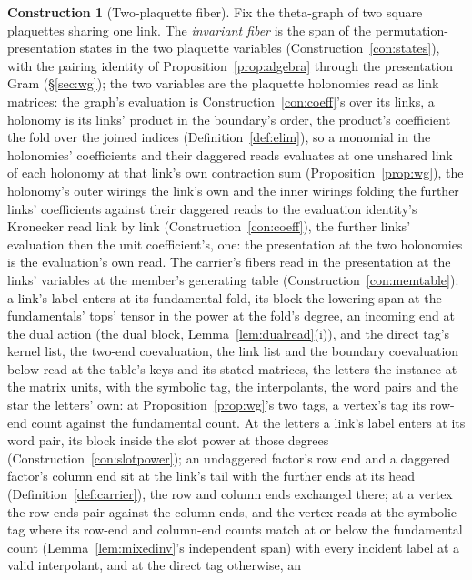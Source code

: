 \documentclass[11pt]{article}
\theoremstyle{definition}
\newtheorem{construction}{Construction}
\begin{document}
\begin{construction}[Two-plaquette fiber]\label{con:fiber}
Fix the theta-graph of two square plaquettes sharing one link. The
\emph{invariant fiber} is the span of the permutation-presentation states
in the two plaquette variables (Construction~\ref{con:states}), with the pairing identity of Proposition~\ref{prop:algebra} through the
presentation Gram (\S\ref{sec:wg}); the two variables are the
plaquette holonomies read as link matrices: the graph's evaluation
is Construction~\ref{con:coeff}'s over its links, a holonomy is
its links' product in the boundary's order, the product's
coefficient the fold over the joined indices
(Definition~\ref{def:elim}), so a monomial in the holonomies'
coefficients and their daggered reads evaluates at one unshared
link of each holonomy at that link's own contraction sum
(Proposition~\ref{prop:wg}), the holonomy's outer wirings the
link's own and the inner wirings folding the further links'
coefficients against their daggered reads to the evaluation
identity's Kronecker read link by link
(Construction~\ref{con:coeff}), the further links' evaluation then
the unit coefficient's, one: the presentation at the two holonomies
is the evaluation's own read.
The carrier's fibers read in the presentation at the links'
variables at the member's generating table
(Construction~\ref{con:memtable}): a link's label enters at its
fundamental fold, its block the lowering span at the fundamentals'
tops' tensor in the power at the fold's degree, an incoming end at
the dual action (the dual block, Lemma~\ref{lem:dualread}(i)), and
the direct tag's kernel list, the two-end coevaluation, the link
list and the boundary coevaluation below read at the table's keys
and its stated matrices, the letters the instance at the matrix
units, with the symbolic tag, the interpolants, the word pairs and
the star the letters' own: at Proposition~\ref{prop:wg}'s two tags, a vertex's tag
its row-end count against the fundamental count. At the letters a
link's label
enters at its word pair, its block inside the slot power at those
degrees (Construction~\ref{con:slotpower}); an undaggered factor's row end and a
daggered factor's column end sit at the link's tail with the
further ends at its head (Definition~\ref{def:carrier}), the row
and column ends exchanged there; at a vertex the row ends pair against the column ends, and
the vertex reads at the symbolic tag where its row-end and
column-end counts match at or below the fundamental count
(Lemma~\ref{lem:mixedinv}'s independent span) with every incident
label at a valid interpolant, and at the direct tag otherwise, an

\end{construction}
\end{document}
